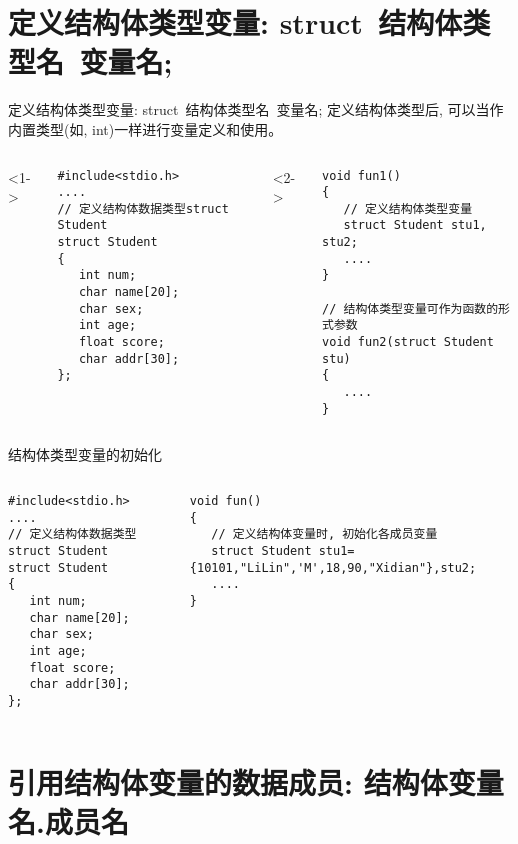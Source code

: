 \section{定义结构体类型变量: struct\, 结构体类型名\, 变量名;}

\begin{frame}{定义结构体类型变量: struct\, 结构体类型名\, 变量名;}
定义结构体类型后, 可以当作内置类型(如, int)一样进行变量定义和使用。
\vspace{-0.2cm}
\begin{columns}[T]
<1->
\begin{lstlisting}
#include<stdio.h>
....
// 定义结构体数据类型struct Student
struct Student 
{
   int num;
   char name[20]; 
   char sex; 
   int age; 
   float score; 
   char addr[30]; 
};         
\end{lstlisting}
<2->
\begin{lstlisting}[frame=leftline]
void fun1()
{
   // 定义结构体类型变量
   struct Student stu1, stu2; 
   .... 
}

// 结构体类型变量可作为函数的形式参数
void fun2(struct Student stu)
{
   ....
}
\end{lstlisting}
\end{columns}
\end{frame}

\begin{frame}{结构体类型变量的初始化}
\begin{columns}[T]
\begin{lstlisting}
#include<stdio.h>
....
// 定义结构体数据类型struct Student
struct Student 
{
   int num;
   char name[20]; 
   char sex; 
   int age; 
   float score; 
   char addr[30]; 
};         
\end{lstlisting}
\begin{lstlisting}[frame=leftline]
void fun()
{
   // 定义结构体变量时, 初始化各成员变量
   struct Student stu1={10101,"LiLin",'M',18,90,"Xidian"},stu2; 
   .... 
}
\end{lstlisting}
\end{columns}
\end{frame}

\section{引用结构体变量的数据成员: 结构体变量名.成员名}

